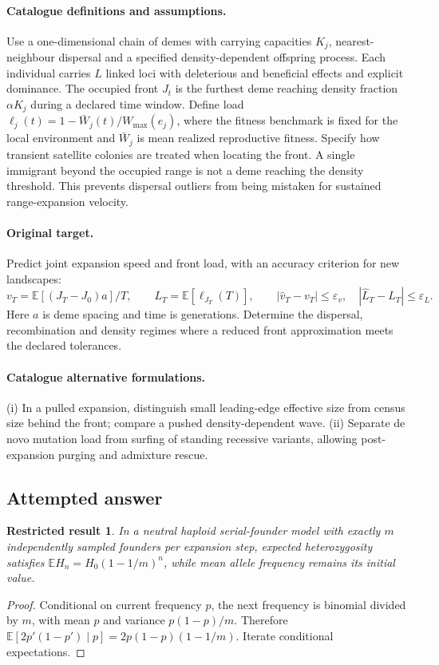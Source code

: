 \documentclass[11pt]{article}
\newcommand{\E}{\mathbb E}
\providecommand{\E}{\mathbb E}
\newtheorem{attemptresult}{Restricted result}[section]
\begin{document}
\paragraph{Catalogue definitions and assumptions.}
Use a one-dimensional chain of demes with carrying capacities $K_j$, nearest-neighbour dispersal and a specified density-dependent offspring process. Each individual carries $L$ linked loci with deleterious and beneficial effects and explicit dominance. The occupied front $J_t$ is the furthest deme reaching density fraction $\alpha K_j$ during a declared time window. Define load $\ell_j(t)=1-\bar W_j(t)/W_{\max}(e_j)$, where the fitness benchmark is fixed for the local environment and $\bar W_j$ is mean realized reproductive fitness. Specify how transient satellite colonies are treated when locating the front. A single immigrant beyond the occupied range is not a deme reaching the density threshold. This prevents dispersal outliers from being mistaken for sustained range-expansion velocity.
\paragraph{Original target.}
Predict joint expansion speed and front load, with an accuracy criterion for new landscapes:
\[
 v_T=\E[(J_T-J_0)a]/T,\qquad
 L_T=\E[\ell_{J_T}(T)],\qquad
 |\widehat v_T-v_T|\le\varepsilon_v,
 \quad |\widehat L_T-L_T|\le\varepsilon_L.
\]
Here $a$ is deme spacing and time is generations. Determine the dispersal, recombination and density regimes where a reduced front approximation meets the declared tolerances.
\paragraph{Catalogue alternative formulations.}
(i) In a pulled expansion, distinguish small leading-edge effective size from census size behind the front; compare a pushed density-dependent wave. (ii) Separate de novo mutation load from surfing of standing recessive variants, allowing post-expansion purging and admixture rescue.
\subsection{Attempted answer}
\begin{attemptresult}
In a neutral haploid serial-founder model with exactly $m$ independently sampled founders per expansion step, expected heterozygosity satisfies $\E H_n=H_0(1-1/m)^n$, while mean allele frequency remains its initial value.
\end{attemptresult}
\begin{proof}
Conditional on current frequency $p$, the next frequency is binomial divided by $m$, with mean $p$ and variance $p(1-p)/m$. Therefore $\E[2p\prime(1-p\prime)\mid p]=2p(1-p)(1-1/m)$. Iterate conditional expectations.
\end{proof}
\end{document}
